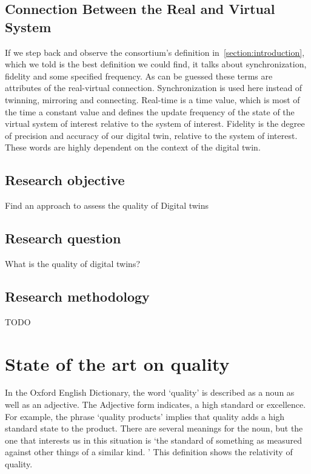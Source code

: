 \documentclass[9pt,conference]{IEEEtran}
\begin{document}
    \subsection*{Connection Between the Real and Virtual System}
    If we step back and observe the consortium's definition in~\ref{section:introduction}, which we told is the best definition we could find, 
    it talks about synchronization, fidelity and some specified frequency. As can be guessed these terms are attributes of the real-virtual connection.
    Synchronization is used here instead of twinning, mirroring and connecting. 
    Real-time is a time value, which is most of the time a constant value and defines the update frequency of the state of the virtual system of interest relative to the system of interest.
    Fidelity is the degree of precision and accuracy of our digital twin, relative to the system of interest.
    These words are highly dependent on the context of the digital twin.
    \subsection{Research objective}
    Find an approach to assess the quality of Digital twins~\cite{Jones2020}

    \subsection{Research question}\label{section: Research Questions}
    What is the quality of digital twins?

    \subsection{Research methodology}
    TODO

    \section{State of the art on quality}
    In the Oxford English Dictionary, the word `quality' is described as a noun as well as an adjective. The Adjective form indicates, a high standard or excellence. 
    For example, the phrase `quality products' implies that quality adds a high standard state to the product. 
    There are several meanings for the noun, but the one that interests us in this situation is `the standard of something as measured against other things of a similar kind. \cite{OxfordDictionary}'
    This definition shows the relativity of quality.
\end{document}
